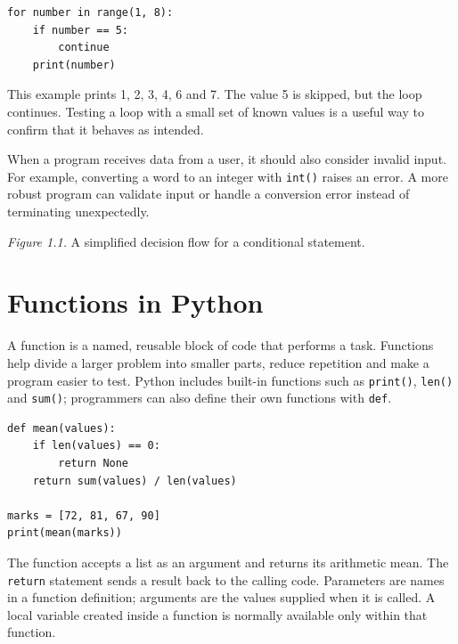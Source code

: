 \documentclass[11pt,openany,oneside]{book}
\begin{document}
\begin{lstlisting}[style=pythonstyle]
for number in range(1, 8):
    if number == 5:
        continue
    print(number)
\end{lstlisting}
This example prints 1, 2, 3, 4, 6 and 7. The value 5 is skipped, but the loop continues. Testing a loop with a small set of known values is a useful way to confirm that it behaves as intended.

When a program receives data from a user, it should also consider invalid input. For example, converting a word to an integer with \texttt{int()} raises an error. A more robust program can validate input or handle a conversion error instead of terminating unexpectedly.

\begin{center}
\end{center}
\textit{Figure 1.1.} A simplified decision flow for a conditional statement.

\section{Functions in Python}
A function is a named, reusable block of code that performs a task. Functions help divide a larger problem into smaller parts, reduce repetition and make a program easier to test. Python includes built-in functions such as \texttt{print()}, \texttt{len()} and \texttt{sum()}; programmers can also define their own functions with \texttt{def}.

\begin{lstlisting}[style=pythonstyle]
def mean(values):
    if len(values) == 0:
        return None
    return sum(values) / len(values)

marks = [72, 81, 67, 90]
print(mean(marks))
\end{lstlisting}
The function accepts a list as an argument and returns its arithmetic mean. The \texttt{return} statement sends a result back to the calling code. Parameters are names in a function definition; arguments are the values supplied when it is called. A local variable created inside a function is normally available only within that function.
\end{document}
